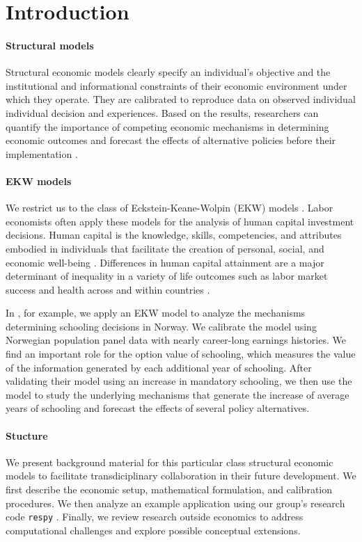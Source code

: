 \section{Introduction}
\paragraph{Structural models}  Structural economic models clearly specify an individual's objective and the institutional and informational constraints of their economic environment under which they operate. They are calibrated to reproduce data on observed individual individual decision and experiences. Based on the results, researchers can quantify the importance of competing economic mechanisms in determining economic outcomes and forecast the effects of alternative policies before their implementation \citep{Wolpin.2013}.

\paragraph{EKW models} We restrict us to the class of Eckstein-Keane-Wolpin (EKW) models \citep{Keane.1997,Blundell.2016,Adda.2017}. Labor economists often apply these models for the analysis of human capital investment decisions. Human capital is the knowledge, skills, competencies, and attributes embodied in individuals that facilitate the creation of personal, social, and economic well-being \citep{Becker.1964}. Differences in human capital attainment are a major determinant of inequality in a variety of life outcomes such as labor market success and health across and within countries \citep{OECD.2001}.

In \citet{Bhuller.2018}, for example, we apply an EKW model to analyze the mechanisms determining schooling decisions in Norway. We calibrate the model using Norwegian population panel data with nearly career-long earnings histories. We find an important role for the option value of schooling, which measures the value of the information generated by each additional year of schooling. After validating their model using an increase in mandatory schooling, we then use the model to study the underlying mechanisms that generate the increase of average years of schooling and forecast the effects of several policy alternatives.

\paragraph{Stucture}  We present background material for this particular class structural economic models to facilitate transdiciplinary collaboration in their future development. We first describe the economic setup, mathematical formulation, and calibration procedures. We then analyze an example application using our group's research code \verb+respy+  \citep{respy-1.0}. Finally, we review research outside economics to address computational challenges and explore possible conceptual extensions.

